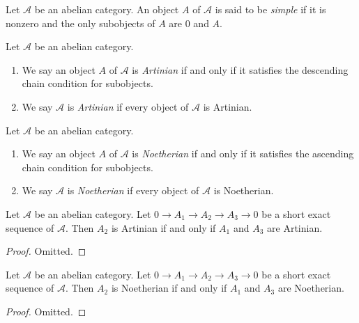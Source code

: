 \begin{definition}
\label{definition-simple}
Let $\mathcal{A}$ be an abelian category. An object $A$ of $\mathcal{A}$
is said to be {\it simple} if it is nonzero and the only subobjects
of $A$ are $0$ and $A$.
\end{definition}

\begin{definition}
\label{definition-Artinian}
Let $\mathcal{A}$ be an abelian category.
\begin{enumerate}
\item We say an object $A$ of $\mathcal{A}$ is {\it Artinian} if and only if
it satisfies the descending chain condition for subobjects.
\item We say $\mathcal{A}$ is {\it Artinian} if every object of
$\mathcal{A}$ is Artinian.
\end{enumerate}
\end{definition}

\begin{definition}
\label{definition-Noetherian}
Let $\mathcal{A}$ be an abelian category.
\begin{enumerate}
\item We say an object $A$ of $\mathcal{A}$ is {\it Noetherian} if and only if
it satisfies the ascending chain condition for subobjects.
\item We say $\mathcal{A}$ is {\it Noetherian} if every object of
$\mathcal{A}$ is Noetherian.
\end{enumerate}
\end{definition}

\begin{lemma}
\label{lemma-ses-artinian}
Let $\mathcal{A}$ be an abelian category. Let $0 \to A_1 \to A_2 \to A_3 \to 0$
be a short exact sequence of $\mathcal{A}$. Then $A_2$ is Artinian
if and only if $A_1$ and $A_3$ are Artinian.
\end{lemma}

\begin{proof}
Omitted.
\end{proof}

\begin{lemma}
\label{lemma-ses-noetherian}
Let $\mathcal{A}$ be an abelian category. Let $0 \to A_1 \to A_2 \to A_3 \to 0$
be a short exact sequence of $\mathcal{A}$. Then $A_2$ is Noetherian
if and only if $A_1$ and $A_3$ are Noetherian.
\end{lemma}

\begin{proof}
Omitted.
\end{proof}

